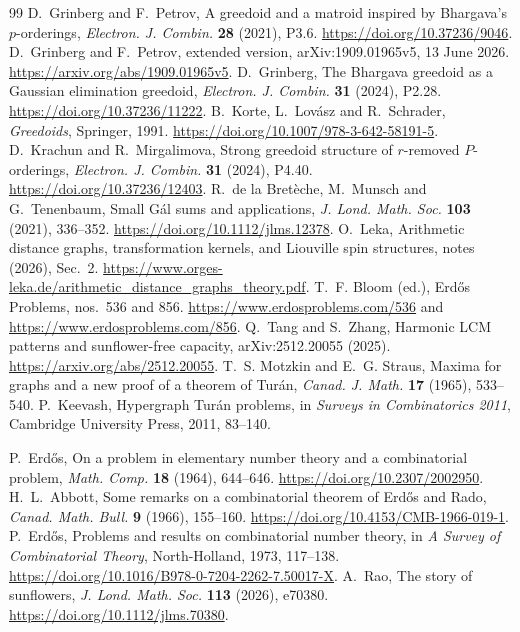 \documentclass[11pt,a4paper]{article}
\begin{document}
\begin{thebibliography}{99}
 D.~Grinberg and F.~Petrov, A greedoid and a matroid inspired by Bhargava's $p$-orderings, \emph{Electron. J. Combin.} \textbf{28} (2021), P3.6. \url{https://doi.org/10.37236/9046}.
 D.~Grinberg and F.~Petrov, extended version, arXiv:1909.01965v5, 13 June 2026. \url{https://arxiv.org/abs/1909.01965v5}.
 D.~Grinberg, The Bhargava greedoid as a Gaussian elimination greedoid, \emph{Electron. J. Combin.} \textbf{31} (2024), P2.28. \url{https://doi.org/10.37236/11222}.
 B.~Korte, L.~Lovász and R.~Schrader, \emph{Greedoids}, Springer, 1991. \url{https://doi.org/10.1007/978-3-642-58191-5}.
 D.~Krachun and R.~Mirgalimova, Strong greedoid structure of $r$-removed $P$-orderings, \emph{Electron. J. Combin.} \textbf{31} (2024), P4.40. \url{https://doi.org/10.37236/12403}.
 R.~de la Bretèche, M.~Munsch and G.~Tenenbaum, Small Gál sums and applications, \emph{J. Lond. Math. Soc.} \textbf{103} (2021), 336--352. \url{https://doi.org/10.1112/jlms.12378}.
 O.~Leka, Arithmetic distance graphs, transformation kernels, and Liouville spin structures, notes (2026), Sec.~2. \url{https://www.orges-leka.de/arithmetic_distance_graphs_theory.pdf}.
 T.~F. Bloom (ed.), Erd\H{o}s Problems, nos.~536 and 856. \url{https://www.erdosproblems.com/536} and \url{https://www.erdosproblems.com/856}.
 Q.~Tang and S.~Zhang, Harmonic LCM patterns and sunflower-free capacity, arXiv:2512.20055 (2025). \url{https://arxiv.org/abs/2512.20055}.
 T.~S. Motzkin and E.~G. Straus, Maxima for graphs and a new proof of a theorem of Turán, \emph{Canad. J. Math.} \textbf{17} (1965), 533--540.
 P.~Keevash, Hypergraph Turán problems, in \emph{Surveys in Combinatorics 2011}, Cambridge University Press, 2011, 83--140.

 P.~Erd\H{o}s, On a problem in elementary number theory and a combinatorial problem, \emph{Math. Comp.} \textbf{18} (1964), 644--646. \url{https://doi.org/10.2307/2002950}.
 H.~L.~Abbott, Some remarks on a combinatorial theorem of Erd\H{o}s and Rado, \emph{Canad. Math. Bull.} \textbf{9} (1966), 155--160. \url{https://doi.org/10.4153/CMB-1966-019-1}.
 P.~Erd\H{o}s, Problems and results on combinatorial number theory, in \emph{A Survey of Combinatorial Theory}, North-Holland, 1973, 117--138. \url{https://doi.org/10.1016/B978-0-7204-2262-7.50017-X}.
 A.~Rao, The story of sunflowers, \emph{J. Lond. Math. Soc.} \textbf{113} (2026), e70380. \url{https://doi.org/10.1112/jlms.70380}.

\end{thebibliography}
\end{document}
